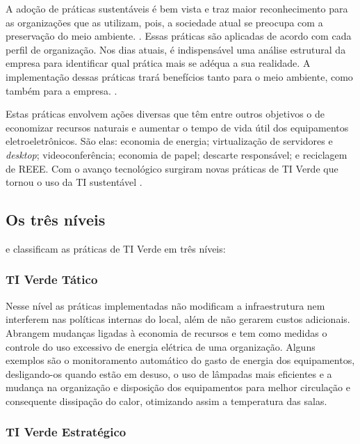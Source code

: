 A adoção de práticas sustentáveis é bem vista e traz maior reconhecimento para as organizações que as utilizam, pois, a sociedade atual se preocupa com a preservação do meio ambiente. \cite{abreu2012ti}. Essas práticas são aplicadas de acordo com cada perfil de organização. Nos dias atuais, é indispensável uma análise estrutural da empresa para identificar qual prática mais se adéqua a sua realidade. A implementação dessas práticas trará benefícios tanto para o meio ambiente, como também para a empresa. \cite{pinto2011estudo}.

Estas práticas envolvem ações diversas que têm entre outros objetivos o de economizar recursos naturais e aumentar o tempo de vida útil dos equipamentos eletroeletrônicos. São elas: economia de energia; virtualização de servidores e \textit{desktop}; videoconferência; economia de papel; descarte responsável; e reciclagem de REEE. Com o avanço tecnológico surgiram novas práticas de TI Verde que tornou o uso da TI sustentável \cite[p. 8]{pinto2011estudo}.

\subsection{Os três níveis}

 e  classificam as práticas de TI Verde em três níveis:

\subsubsection{TI Verde Tático}

Nesse nível as práticas implementadas não modificam a infraestrutura nem interferem nas políticas internas do local, além de não gerarem custos adicionais. Abrangem mudanças ligadas à economia de recursos e tem como medidas o controle do uso excessivo de energia elétrica de uma organização. Alguns exemplos são o monitoramento automático do gasto de energia dos equipamentos, desligando-os quando estão em desuso, o uso de lâmpadas mais eficientes e a mudança na organização e disposição dos equipamentos para melhor circulação e consequente dissipação do calor, otimizando assim a temperatura das salas.

\subsubsection{TI Verde Estratégico}

